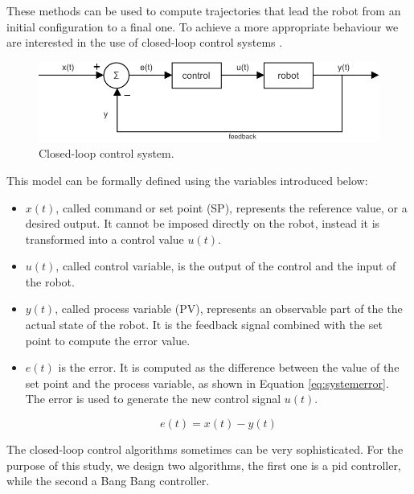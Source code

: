 These methods can be used to compute trajectories that lead the robot from an 
initial configuration to a final one. To achieve a more appropriate behaviour we 
are interested in the use of closed-loop control systems 
\cite[][]{siegwart2011introduction}.

\begin{figure}[!htb]
	\centering
	\includegraphics[width=.8\textwidth]{contents/images/closed-loop-control-system}
	\caption{Closed-loop control system.}
	\label{fig:closedloopcontrol}
\end{figure}
This model can be formally defined using the variables introduced below: 
\begin{itemize}
	\item $x(t)$, called command or set point (SP), represents the reference 
	value, or a desired output. It cannot be imposed directly on the robot, instead it 
	is transformed into a control value $u(t)$.
	
	\item $u(t)$, called control variable, is the output of the control and the 
	input of the robot.
	
	\item $y(t)$, called process variable (PV), represents an observable part of the 
	the actual state of the robot. It is the feedback signal combined with the set 
	point to compute the error value.

	\item $e(t)$ is the error. It is computed as the difference between the value of 
	the set point and the process variable, as shown in Equation 
	\ref{eq:systemerror}. The error is used to generate the new control signal $u(t)$.
	\begin{Equation}[!h]
		\centering
		\begin{equation}
		e(t) = x(t) - y(t)
		\end{equation}
		\caption{Calculation of the error value $e(t)$ of the system.}
		\label{eq:systemerror}
	\end{Equation}	
\end{itemize} 

The closed-loop control algorithms sometimes can be very sophisticated. For the 
purpose of this study, we design two algorithms, the first one is a \gls{pid} 
controller, while the second a Bang Bang controller.

